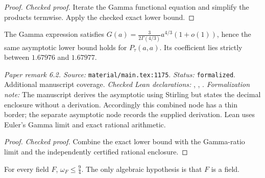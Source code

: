 \begin{proof}
\leanok
{}
\textit{Checked proof.} Iterate the Gamma functional equation and simplify the products termwise. Apply the checked exact lower bound.
\end{proof}

\renewcommand{\thetheorem}{6.2}
\begin{remark}
\label{rem:gamma-coefficient}
\leanok
The Gamma expression satisfies $G(a)=\frac{3}{2\Gamma(4/3)}a^{4/3}(1+o(1))$, hence the same asymptotic lower bound holds for $P_\tau(a,a)$. Its coefficient lies strictly between $1.67976$ and $1.67977$.
\end{remark}

\noindent\textit{Paper remark 6.2. Source:} \texttt{material/main.tex:1175}.
\textit{Status:} \texttt{formalized}. Additional manuscript coverage.
\textit{Checked Lean declarations:} , , .
\textit{Formalization note:} The manuscript derives the asymptotic using Stirling but states the decimal enclosure without a derivation. Accordingly this combined node has a thin border; the separate asymptotic node records the supplied derivation. Lean uses Euler’s Gamma limit and exact rational arithmetic.

\begin{proof}
\leanok
{}
\textit{Checked proof.} Combine the exact lower bound with the Gamma-ratio limit and the independently certified rational enclosure.
\end{proof}

\renewcommand{\thetheorem}{6.3}
\begin{theorem}
\label{thm:omega-le-nine-fourths}
\manuscriptproof
{}
\leanok
For every field $F$, $\omega_F\le\frac94$. The only algebraic hypothesis is that $F$ is a field.
\end{theorem}

